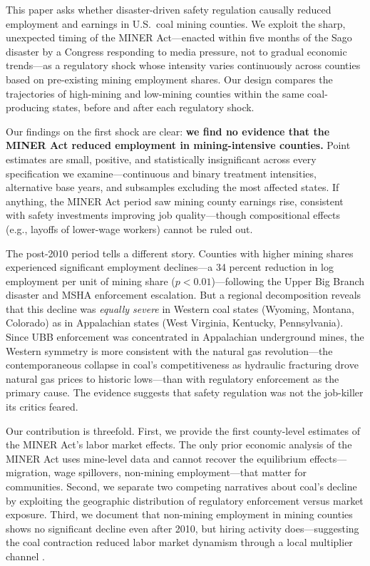 \documentclass[12pt]{article}
\begin{document}
This paper asks whether disaster-driven safety regulation causally reduced employment and earnings in U.S.\ coal mining counties. We exploit the sharp, unexpected timing of the MINER Act---enacted within five months of the Sago disaster by a Congress responding to media pressure, not to gradual economic trends---as a regulatory shock whose intensity varies continuously across counties based on pre-existing mining employment shares. Our design compares the trajectories of high-mining and low-mining counties within the same coal-producing states, before and after each regulatory shock.

Our findings on the first shock are clear: \textbf{we find no evidence that the MINER Act reduced employment in mining-intensive counties.} Point estimates are small, positive, and statistically insignificant across every specification we examine---continuous and binary treatment intensities, alternative base years, and subsamples excluding the most affected states. If anything, the MINER Act period saw mining county earnings rise, consistent with safety investments improving job quality---though compositional effects (e.g., layoffs of lower-wage workers) cannot be ruled out.

The post-2010 period tells a different story. Counties with higher mining shares experienced significant employment declines---a 34 percent reduction in log employment per unit of mining share ($p < 0.01$)---following the Upper Big Branch disaster and MSHA enforcement escalation. But a regional decomposition reveals that this decline was \textit{equally severe} in Western coal states (Wyoming, Montana, Colorado) as in Appalachian states (West Virginia, Kentucky, Pennsylvania). Since UBB enforcement was concentrated in Appalachian underground mines, the Western symmetry is more consistent with the natural gas revolution---the contemporaneous collapse in coal's competitiveness as hydraulic fracturing drove natural gas prices to historic lows---than with regulatory enforcement as the primary cause. The evidence suggests that safety regulation was not the job-killer its critics feared.

Our contribution is threefold. First, we provide the first county-level estimates of the MINER Act's labor market effects. The only prior economic analysis of the MINER Act \citep{li2022miner} uses mine-level data and cannot recover the equilibrium effects---migration, wage spillovers, non-mining employment---that matter for communities. Second, we separate two competing narratives about coal's decline by exploiting the geographic distribution of regulatory enforcement versus market exposure. Third, we document that non-mining employment in mining counties shows no significant decline even after 2010, but hiring activity does---suggesting the coal contraction reduced labor market dynamism through a local multiplier channel \citep{moretti2010local}.
\end{document}
